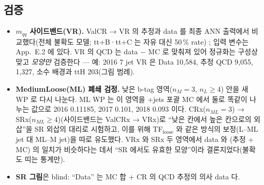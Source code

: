 \subsection{검증}
\begin{itemize}
\item \textbf{$m_{qq}$ 사이드밴드(VR).} ValCR → VR 의 추정과 data 를 최종 ANN 출력에서 비교했다(전체 불확도 모델; tt+B·tt+C 는 자유 대신 50\,\% rate)
      ; 입력 변수는 App.\ E.2 에 있다. VR 의 QCD 는 data $-$ MC 로 맞춰져 있어 정규화는 구성상 맞고 \emph{모양만}
      검증한다 — 예: 2016 7 jet VR 은 Data 10,584, 추정 QCD 9,055, \ttbar{} 1,327, 소수 배경과 ttH 203(그림 범례).
\item \textbf{MediumLoose(ML) 폐쇄 검정.} 낮은 b-tag 영역($n_M=3$, $n_L\ge4$) 안을 새 WP 로 다시 나눈다. ML WP 는 이 영역을 \ttbar{}+jets 포괄 MC 에서 둘로
      똑같이 나누는 값으로 2016 0.11185, 2017 0.101, 2018 0.093 이다. CRx($n_{ML}=3$) → SRx($n_{ML}\ge4$)(사이드밴드는
      ValCRx → VRx)로 ``낮은 칸에서 높은 칸으로의 외삽''을 SR 외삽의 대리로 시험하고, 이를 위해 TF$_{\text{loose}}$ 와 같은 방식의 보정(L–ML jet 대 ML–M jet)을
      따로 유도했다. VRx 와 SRx 두 영역에서 data 와 (추정 + MC) 의 일치가 비슷하다는 데서
      ``SR 에서도 유효한 모양''이라 결론지었다(불확도 띠는 통계만).
\item \textbf{SR 그림}은 blind: ``Data'' 는 MC 합 + CR 의 QCD 추정의 의사 data 다.
\end{itemize}

